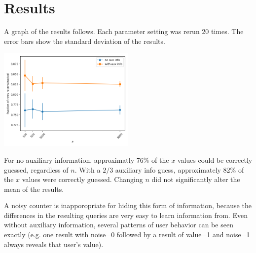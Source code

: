 \documentclass{article}
\begin{document}
\section{Results}

A graph of the results follows.  Each parameter setting was rerun 20 times.  The error bars show the standard
deviation of the results.

\begin{center}
    \includegraphics[width=0.5\textwidth]{running_counter.png}
\end{center}

For no auxiliary information, approximatly 76\% of the $x$ values could be
correctly guessed, regardless of $n$.  With a $2/3$ auxiliary info guess, approximately 82\% of the $x$ values
were correctly guessed.  Changing $n$ did not significantly alter the mean of the results.

A noisy counter is inapporopriate for hiding this form of information, because the differences in the
resulting queries are very easy to learn information from.  Even without auxiliary information, several
patterns of user behavior can be seen exactly (e.g. one result with noise=0 followed by a result of value=1
and noise=1 always reveals that user's value).
\end{document}
